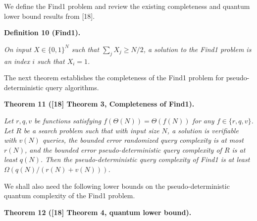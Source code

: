 We define the Find1 problem and review the existing completeness and quantum lower bound results from [18].\par





\par\medskip\noindent\textbf{
\textbf{Definition 10}\textbf{ }(Find1)\textbf{.}
}\par



\emph{On input $X\in\{0,1\}^{N}$ such that $\sum_{j}X_{j}\geq N/2$, a solution to the Find1 problem is an index $i$ such that $X_{i}=1$.}\par






The next theorem establishes the completeness of the Find1 problem for pseudo-deterministic query algorithms.\par





\par\medskip\noindent\textbf{
\textbf{Theorem 11}\textbf{ }([18] Theorem 3, Completeness of Find1)\textbf{.}
}\par



\emph{Let $r,q,v$ be functions satisfying $f(\Theta(N))=\Theta(f(N))$ for any $f\in\{r,q,v\}$.
Let ${R}$ be a search problem such that with input size $N$, a solution is verifiable with $v(N)$ queries, the bounded error randomized query complexity is at most $r(N)$, and the bounded error pseudo-deterministic query complexity of ${R}$ is at least $q(N)$. Then the pseudo-deterministic query complexity of Find1 is at least $\Omega(q(N)/(r(N)+v(N)))$.}\par






We shall also need the following lower bounds on the pseudo-deterministic quantum complexity of the Find1 problem.\par





\par\medskip\noindent\textbf{
\textbf{Theorem 12}\textbf{ }([18] Theorem 4, quantum lower bound)\textbf{.}
}\par



